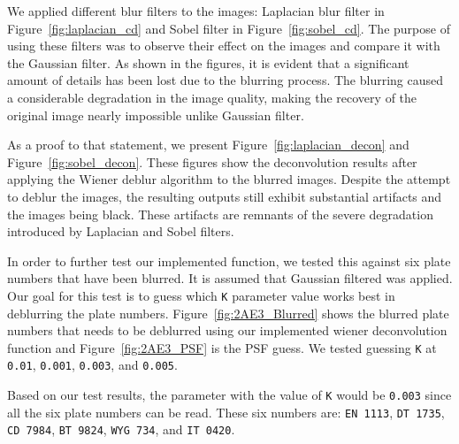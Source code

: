 \documentclass{article}
\begin{document}
\begin{itemize}
			We applied different blur filters to the images: Laplacian blur filter in Figure~\ref{fig:laplacian_cd} and Sobel filter in Figure~\ref{fig:sobel_cd}. 
			The purpose of using these filters was to observe their effect on the images and compare it with the Gaussian filter. As shown in the figures, it is evident that a 
			significant amount of details has been lost due to the blurring process. The blurring caused a considerable degradation in the image quality, making the recovery of the original 
			image nearly impossible unlike Gaussian filter.

			As a proof to that statement, we present Figure~\ref{fig:laplacian_decon} and Figure~\ref{fig:sobel_decon}. These figures show the deconvolution results after applying the 
			Wiener deblur algorithm to the blurred images. Despite the attempt to deblur the images, the resulting outputs still exhibit substantial artifacts and the images being black. 
			These artifacts are remnants of the severe degradation introduced by Laplacian and Sobel filters.

	\end{itemize}
	
	\vspace{15pt}
	\par
	\vspace{10pt}
	In order to further test our implemented function, we tested this against six plate numbers that have been blurred. It is assumed that Gaussian filtered was applied. Our goal for this
	test is to guess which {\texttt{K}} parameter value works best in deblurring the plate numbers. {Figure~\ref{fig:2AE3_Blurred}} shows the blurred plate numbers that needs to be deblurred
	using our implemented wiener deconvolution function and {Figure~\ref{fig:2AE3_PSF}} is the PSF guess. We tested guessing {\texttt{K}} at {\texttt{0.01}}, {\texttt{0.001}}, 
	{\texttt{0.003}}, and {\texttt{0.005}}.

	Based on our test results, the parameter with the value of {\texttt{K}} would be {\texttt{0.003}} since all the six plate numbers can be read. These six numbers are: {\texttt{EN 1113}}, {\texttt{DT 1735}}, 
	{\texttt{CD 7984}}, {\texttt{BT 9824}}, {\texttt{WYG 734}}, and {\texttt{IT 0420}}.
\end{document}
